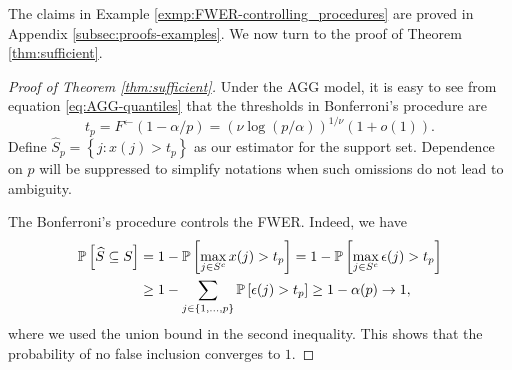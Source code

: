 The claims in Example \ref{exmp:FWER-controlling_procedures} are proved in Appendix \ref{subsec:proofs-examples}.
We now turn to the proof of Theorem \ref{thm:sufficient}.

\begin{proof}[Proof of Theorem \ref{thm:sufficient}]
Under the AGG model, it is easy to see from equation \eqref{eq:AGG-quantiles} that the thresholds in Bonferroni's procedure are 
\begin{equation}\label{e:AGG-threshold}
t_p = F^{\leftarrow}(1 - \alpha/p) = (\nu\log{(p/\alpha)})^{1/\nu}(1+o(1)).
\end{equation}
Define $\widehat{S}_p = \left\{j:x(j)>t_p\right\}$ as our estimator for the support set. 
Dependence on $p$ will be suppressed to simplify notations when such omissions do not lead to ambiguity.

The Bonferroni's procedure controls the FWER.  Indeed, we have
\begin{align}\label{eq:Bonferroni-FWER-control}
    \P\left[\widehat{S} \subseteq S\right] 
        &= 1 - \P\left[\max_{j\in S^c}x(j) > t_p\right] = 1 - \P\left[\max_{j\in S^c}\epsilon(j) > t_p\right]\nonumber \\
        &\ge 1 - \sum_{j\in\{1,\ldots,p\}}\P\left[\epsilon(j)>t_p\right] \ge 1 - \alpha(p) \to 1,
\end{align}
where we used the union bound in the second inequality. This shows that the probability of no false inclusion converges to $1$.


\end{proof}
